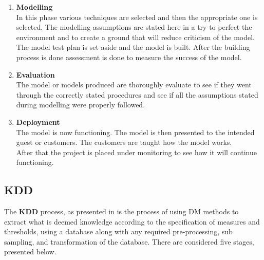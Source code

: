 \documentclass[12pt]{report}
\begin{document}
\begin{enumerate}
		\item \textbf{Modelling}\\
		
		In this phase various techniques are selected and then the appropriate one is selected. The modelling assumptions are stated here in a try to perfect the environment and to create a ground that will reduce criticism of the model. The model test plan is set aside and the model is built. After the building process is done assessment is done to measure the success of the model.\\
		
		\item \textbf{Evaluation}\\
		The model or models produced are thoroughly evaluate to see if they went through the correctly stated procedures and see if all the assumptions stated during modelling were properly followed.\\
		
		\item \textbf{Deployment}\\
		The model is now functioning. The model is then presented to the intended guest or customers. The customers are taught how the model works.\\
		
		After that the project is placed under monitoring to see how it will continue functioning. \\
		
	\end{enumerate}
		
	\subsection{KDD}
	The \textbf{KDD} process, as presented in \citep{fayyad1996kdd} is the process of using DM methods to extract what is deemed knowledge according to the specification of measures and thresholds, using a database along with any required pre-processing, sub sampling, and transformation of the database. There are considered five stages, presented below.\\
	
\end{document}
